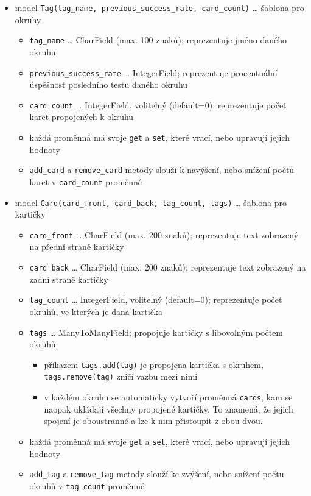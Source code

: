 \documentclass[11pt]{article}
\providecommand{\tightlist}{\setlength{\itemsep}{1pt}\setlength{\parskip}{1pt}}
\let\oldtexttt\texttt
\renewcommand{\texttt}[1]{\oldtexttt{\textcolor{codehighlight}{#1}}}
\begin{document}
\begin{itemize}
\tightlist
\item
  model \texttt{Tag(tag\_name,\ previous\_success\_rate,\ card\_count)}
  \ldots{} šablona pro okruhy

  \begin{itemize}
  \tightlist
  \item
    \texttt{tag\_name} \ldots{} CharField (max. 100 znaků); reprezentuje
    jméno daného okruhu
  \item
    \texttt{previous\_success\_rate} \ldots{} IntegerField; reprezentuje
    procentuální úspěšnost posledního testu daného okruhu
  \item
    \texttt{card\_count} \ldots{} IntegerField, volitelný (default=0);
    reprezentuje počet karet propojených k okruhu
  \item
    každá proměnná má svoje \texttt{get} a \texttt{set}, které vrací,
    nebo upravují jejich hodnoty
  \item
    \texttt{add\_card} a \texttt{remove\_card} metody slouží k navýšení,
    nebo snížení počtu karet v \texttt{card\_count} proměnné
  \end{itemize}
\item
  model \texttt{Card(card\_front,\ card\_back,\ tag\_count,\ tags)}
  \ldots{} šablona pro kartičky

  \begin{itemize}
  \tightlist
  \item
    \texttt{card\_front} \ldots{} CharField (max. 200 znaků);
    reprezentuje text zobrazený na přední straně kartičky
  \item
    \texttt{card\_back} \ldots{} CharField (max. 200 znaků);
    reprezentuje text zobrazený na zadní straně kartičky
  \item
    \texttt{tag\_count} \ldots{} IntegerField, volitelný (default=0);
    reprezentuje počet okruhů, ve kterých je daná kartička
  \item
    \texttt{tags} \ldots{} ManyToManyField; propojuje kartičky s
    libovolným počtem okruhů

    \begin{itemize}
    \tightlist
    \item
      příkazem \texttt{tags.add(tag)} je propojena kartička s okruhem,
      \texttt{tags.remove(tag)} zničí vazbu mezi nimi
    \item
      v každém okruhu se automaticky vytvoří proměnná \texttt{cards},
      kam se naopak ukládají všechny propojené kartičky. To znamená, že
      jejich spojení je oboustranné a lze k nim přistoupit z obou dvou.
    \end{itemize}
  \item
    každá proměnná má svoje \texttt{get} a \texttt{set}, které vrací,
    nebo upravují jejich hodnoty
  \item
    \texttt{add\_tag} a \texttt{remove\_tag} metody slouží ke zvýšení,
    nebo snížení počtu okruhů v \texttt{tag\_count} proměnné
  \end{itemize}
\end{itemize}
\end{document}
